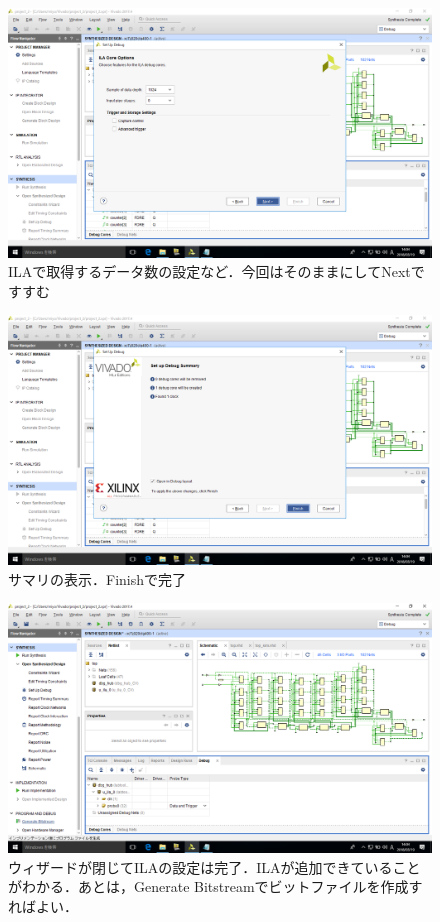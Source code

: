 \documentclass[a4paper,dvipdfmx]{jsarticle}
\begin{document}
 \begin{figure}[H]
  \begin{center}
   \includegraphics[width=.8\textwidth]{chapter05_figures/VirtualBox_Windows10_19_03_2018_14_04_08.png}
  \end{center}
  \caption{ILAで取得するデータ数の設定など．今回はそのままにしてNextですすむ}
 \end{figure}

 \begin{figure}[H]
  \begin{center}
   \includegraphics[width=.8\textwidth]{chapter05_figures/VirtualBox_Windows10_19_03_2018_14_04_13.png}
  \end{center}
  \caption{サマリの表示．Finishで完了}
 \end{figure}

 \begin{figure}[H]
  \begin{center}
   \includegraphics[width=.8\textwidth]{chapter05_figures/VirtualBox_Windows10_19_03_2018_14_04_28.png}
  \end{center}
  \caption{ウィザードが閉じてILAの設定は完了．ILAが追加できていることがわかる．あとは，Generate Bitstreamでビットファイルを作成すればよい．}
 \end{figure}
\end{document}
